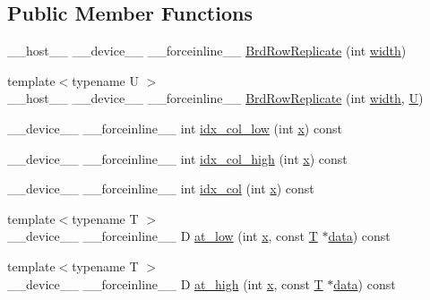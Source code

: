 \subsection*{Public Member Functions}
\begin{DoxyCompactItemize}
\item 
\-\_\-\-\_\-host\-\_\-\-\_\- \-\_\-\-\_\-device\-\_\-\-\_\- \-\_\-\-\_\-forceinline\-\_\-\-\_\- \hyperlink{structcv_1_1gpu_1_1device_1_1BrdRowReplicate_a521fe4c29960145f5b7ed65b12226984}{Brd\-Row\-Replicate} (int \hyperlink{highgui__c_8h_a2474a5474cbff19523a51eb1de01cda4}{width})
\item 
{\footnotesize template$<$typename U $>$ }\\\-\_\-\-\_\-host\-\_\-\-\_\- \-\_\-\-\_\-device\-\_\-\-\_\- \-\_\-\-\_\-forceinline\-\_\-\-\_\- \hyperlink{structcv_1_1gpu_1_1device_1_1BrdRowReplicate_a17b4399c1884d15fd18031c6fe7857fa}{Brd\-Row\-Replicate} (int \hyperlink{highgui__c_8h_a2474a5474cbff19523a51eb1de01cda4}{width}, \hyperlink{core__c_8h_aa9c521f41af9a5191e5e4b6ffbae211a}{U})
\item 
\-\_\-\-\_\-device\-\_\-\-\_\- \-\_\-\-\_\-forceinline\-\_\-\-\_\- int \hyperlink{structcv_1_1gpu_1_1device_1_1BrdRowReplicate_a6be808f3a6e448abfdb5c2ce74dd5ae0}{idx\-\_\-col\-\_\-low} (int \hyperlink{highgui__c_8h_a6150e0515f7202e2fb518f7206ed97dc}{x}) const 
\item 
\-\_\-\-\_\-device\-\_\-\-\_\- \-\_\-\-\_\-forceinline\-\_\-\-\_\- int \hyperlink{structcv_1_1gpu_1_1device_1_1BrdRowReplicate_a0374ab5b7ce00b82b6a726f06834e2c2}{idx\-\_\-col\-\_\-high} (int \hyperlink{highgui__c_8h_a6150e0515f7202e2fb518f7206ed97dc}{x}) const 
\item 
\-\_\-\-\_\-device\-\_\-\-\_\- \-\_\-\-\_\-forceinline\-\_\-\-\_\- int \hyperlink{structcv_1_1gpu_1_1device_1_1BrdRowReplicate_a5afd0faf29477d122a3fcdbf8db6f033}{idx\-\_\-col} (int \hyperlink{highgui__c_8h_a6150e0515f7202e2fb518f7206ed97dc}{x}) const 
\item 
{\footnotesize template$<$typename T $>$ }\\\-\_\-\-\_\-device\-\_\-\-\_\- \-\_\-\-\_\-forceinline\-\_\-\-\_\- D \hyperlink{structcv_1_1gpu_1_1device_1_1BrdRowReplicate_a47b592a6c65534431b6b0931d6715ec0}{at\-\_\-low} (int \hyperlink{highgui__c_8h_a6150e0515f7202e2fb518f7206ed97dc}{x}, const \hyperlink{calib3d_8hpp_a3efb9551a871ddd0463079a808916717}{T} $\ast$\hyperlink{legacy_8hpp_ab9fe6c09e6d02865a953fffc12fe6ca0}{data}) const 
\item 
{\footnotesize template$<$typename T $>$ }\\\-\_\-\-\_\-device\-\_\-\-\_\- \-\_\-\-\_\-forceinline\-\_\-\-\_\- D \hyperlink{structcv_1_1gpu_1_1device_1_1BrdRowReplicate_a4a26a9ba1fba4fe7e2297ca937fc02de}{at\-\_\-high} (int \hyperlink{highgui__c_8h_a6150e0515f7202e2fb518f7206ed97dc}{x}, const \hyperlink{calib3d_8hpp_a3efb9551a871ddd0463079a808916717}{T} $\ast$\hyperlink{legacy_8hpp_ab9fe6c09e6d02865a953fffc12fe6ca0}{data}) const 

\end{DoxyCompactItemize}
